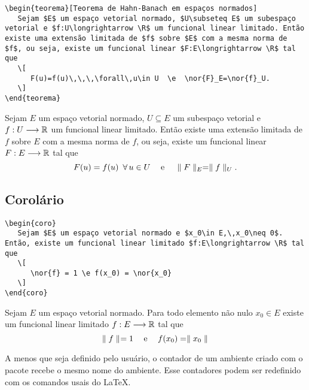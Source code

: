 \begin{tcolorbox}
\begin{lstlisting}
\begin{teorema}[Teorema de Hahn-Banach em espaços normados]
   Sejam $E$ um espaço vetorial normado, $U\subseteq E$ um subespaço vetorial e $f:U\longrightarrow \R$ um funcional linear limitado. Então existe uma extensão limitada de $f$ sobre $E$ com a mesma norma de $f$, ou seja, existe um funcional linear $F:E\longrightarrow \R$ tal que
   \[
      F(u)=f(u)\,\,\,\forall\,u\in U  \e  \nor{F}_E=\nor{f}_U.
   \]
\end{teorema}
\end{lstlisting}
	\tcblower
\begin{teorema}
	Sejam $E$ um espaço vetorial normado, $U\subseteq E$ um subespaço vetorial e $f:U\longrightarrow \R$ um funcional linear limitado. Então existe uma extensão limitada de $f$ sobre $E$ com a mesma norma de $f$, ou seja, existe um funcional linear $F:E\longrightarrow \R$ tal que
	\[
	   F(u)=f(u)\,\,\,\forall\,u\in U  \e  \nor[E]{F}=\nor[U]{f}.
	\]
\end{teorema}
\end{tcolorbox}

\subsection{Corolário}
\begin{tcolorbox}
\begin{lstlisting}
\begin{coro}
   Sejam $E$ um espaço vetorial normado e $x_0\in E,\,x_0\neq 0$. Então, existe um funcional linear limitado $f:E\longrightarrow \R$ tal que
   \[
      \nor{f} = 1 \e f(x_0) = \nor{x_0}
   \]
\end{coro}
\end{lstlisting}
\tcblower
\begin{coro}
   Sejam $E$ um espaço vetorial normado. Para todo elemento não nulo $x_0\in E$  existe um funcional linear limitado $f:E\longrightarrow \R$  tal que
   \[
      \nor{f} = 1 \e f(x_0) = \nor{x_0}
   \]
\end{coro}
\end{tcolorbox}

A menos que seja definido pelo usuário, o contador de um ambiente criado com o pacote  recebe o mesmo nome do ambiente. Esse contadores podem ser redefinido com os comandos usais do \LaTeX.


